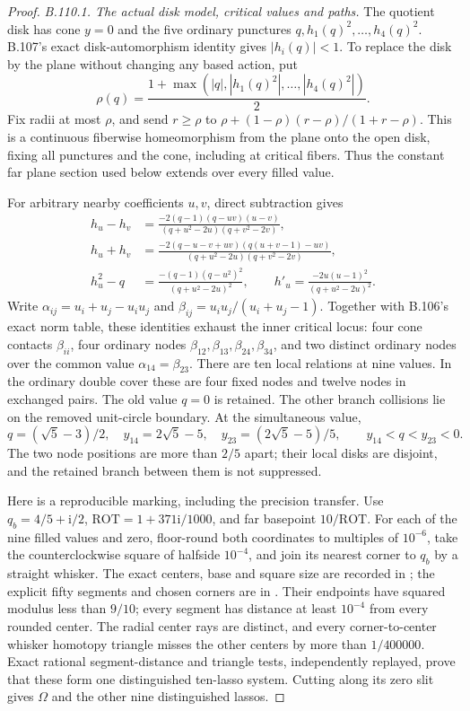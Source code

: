 \begin{proof}
\emph{B.110.1. The actual disk model, critical values and paths.}
The quotient disk has cone $y=0$ and the five ordinary punctures
$q,h_1(q)^2,\ldots,h_4(q)^2$. B.107's exact disk-automorphism
identity gives $|h_i(q)|<1$. To replace the disk by the plane without
changing any based action, put
\[
 \rho(q)=\frac{1+\max(|q|,|h_1(q)^2|,\ldots,|h_4(q)^2|)}2.
\]
Fix radii at most $\rho$, and send $r\geq\rho$ to
$\rho+(1-\rho)(r-\rho)/(1+r-\rho)$. This is a continuous
fiberwise homeomorphism from the plane onto the open disk, fixing
all punctures and the cone, including at critical fibers. Thus the
constant far plane section used below extends over every filled value.

For arbitrary nearby coefficients $u,v$, direct subtraction gives
\begin{align*}
 h_u-h_v&=\frac{-2(q-1)(q-uv)(u-v)}
 {(q+u^2-2u)(q+v^2-2v)},\\
 h_u+h_v&=\frac{-2(q-u-v+uv)(q(u+v-1)-uv)}
 {(q+u^2-2u)(q+v^2-2v)},\\
 h_u^2-q&=\frac{-(q-1)(q-u^2)^2}{(q+u^2-2u)^2},
 \qquad h'_u=\frac{-2u(u-1)^2}{(q+u^2-2u)^2}.
\end{align*}
Write $\alpha_{ij}=u_i+u_j-u_iu_j$ and
$\beta_{ij}=u_iu_j/(u_i+u_j-1)$. Together with B.106's exact
norm table, these identities exhaust the inner critical locus:
four cone contacts $\beta_{ii}$, four ordinary nodes
$\beta_{12},\beta_{13},\beta_{24},\beta_{34}$, and two distinct
ordinary nodes over the common value $\alpha_{14}=\beta_{23}$.
There are ten local relations at nine values. In the ordinary double
cover these are four fixed nodes and twelve nodes in exchanged pairs.
The old value $q=0$ is retained. The other branch collisions lie on
the removed unit-circle boundary. At the simultaneous value,
\[
 q=(\sqrt5-3)/2,\quad y_{14}=2\sqrt5-5,\quad
 y_{23}=(2\sqrt5-5)/5,
 \qquad y_{14}<q<y_{23}<0.
\]
The two node positions are more than $2/5$ apart; their local disks
are disjoint, and the retained branch between them is not suppressed.

Here is a reproducible marking, including the precision transfer.
Use $q_b=4/5+\mathrm i/2$, $\mathrm{ROT}=1+371\mathrm i/1000$,
and far basepoint $10/\mathrm{ROT}$. For each of the nine filled
values and zero, floor-round both coordinates to multiples of
$10^{-6}$, take the counterclockwise square of halfside $10^{-4}$,
and join its nearest corner to $q_b$ by a straight whisker.
The exact centers, base and square size are recorded in
;
the explicit fifty segments and chosen corners are in
.
Their endpoints have squared modulus less than $9/10$; every
segment has distance at least $10^{-4}$ from every rounded center.
The radial center rays are distinct, and every corner-to-center
whisker homotopy triangle misses the other centers by more than
$1/400000$. Exact rational segment-distance and triangle tests,
independently replayed, prove that these form one distinguished
ten-lasso system. Cutting along its zero slit gives $\Omega$ and
the other nine distinguished lassos.


\end{proof}

